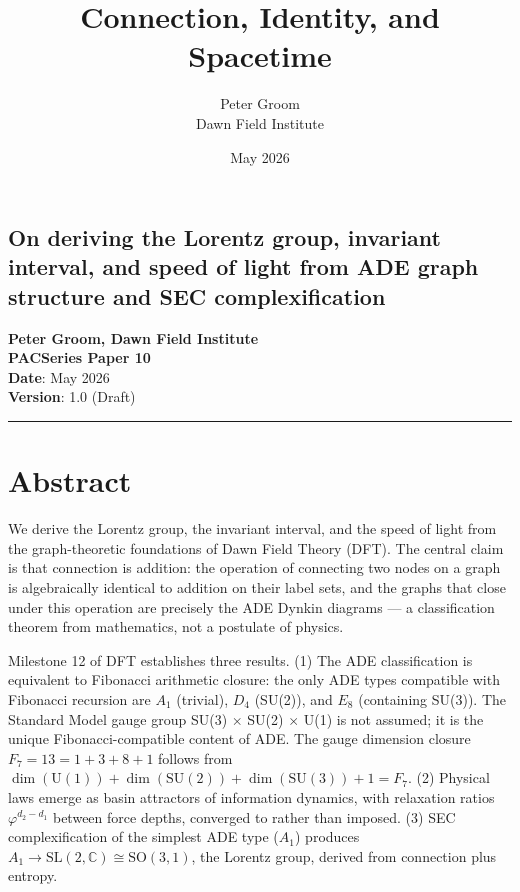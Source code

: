 \documentclass[11pt,a4paper]{article}
\title{Connection, Identity, and Spacetime}
\author{Peter Groom \\ Dawn Field Institute}
\date{May 2026}
\begin{document}
\maketitle

\subsection*{On deriving the Lorentz group, invariant interval, and speed of light from ADE graph structure and SEC complexification}

\textbf{Peter Groom, Dawn Field Institute} \\
\textbf{PACSeries Paper 10} \\
\textbf{Date}: May 2026 \\
\textbf{Version}: 1.0 (Draft)

\begin{center}\rule{0.5\linewidth}{0.4pt}\end{center}

\section*{Abstract}

We derive the Lorentz group, the invariant interval, and the speed of light from the graph-theoretic foundations of Dawn Field Theory (DFT). The central claim is that connection is addition: the operation of connecting two nodes on a graph is algebraically identical to addition on their label sets, and the graphs that close under this operation are precisely the ADE Dynkin diagrams — a classification theorem from mathematics, not a postulate of physics.

Milestone 12 of DFT establishes three results. (1) The ADE classification is equivalent to Fibonacci arithmetic closure: the only ADE types compatible with Fibonacci recursion are $A_1$ (trivial), $D_4$ (SU(2)), and $E_8$ (containing SU(3)). The Standard Model gauge group SU(3) $\times$ SU(2) $\times$ U(1) is not assumed; it is the unique Fibonacci-compatible content of ADE. The gauge dimension closure $F_7 = 13 = 1 + 3 + 8 + 1$ follows from $\dim(\text{U}(1)) + \dim(\text{SU}(2)) + \dim(\text{SU}(3)) + 1 = F_7$. (2) Physical laws emerge as basin attractors of information dynamics, with relaxation ratios $\varphi^{d_2 - d_1}$ between force depths, converged to rather than imposed. (3) SEC complexification of the simplest ADE type ($A_1$) produces $A_1 \to \text{SL}(2,\mathbb{C}) \cong \text{SO}(3,1)$, the Lorentz group, derived from connection plus entropy.
\end{document}
